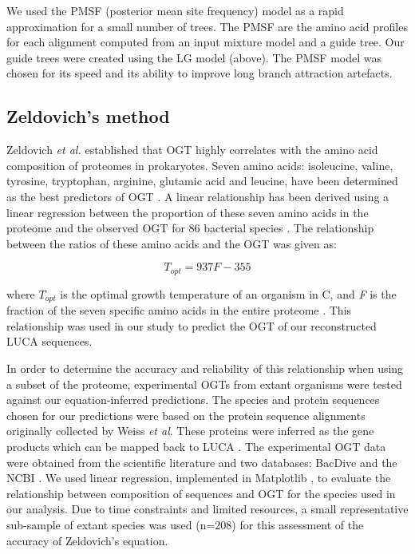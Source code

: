 We used the PMSF (posterior mean site frequency) model as a rapid approximation for a small number of trees. The PMSF are the amino acid profiles for each alignment computed from an input mixture model and a guide tree. Our guide trees were created using the LG model (above). The PMSF model was chosen for its speed and its ability to improve long branch attraction artefacts\cite{wang2017modeling}.

\subsection{Zeldovich's method}
Zeldovich \textit{et al.} \cite{zeldovich2007} established that OGT highly correlates with the amino acid composition of proteomes in prokaryotes. Seven amino acids: isoleucine, valine, tyrosine, tryptophan, arginine, glutamic acid and leucine, have been determined as the best predictors of OGT \cite{zeldovich2007}. A linear relationship has been derived using a linear regression between the proportion of these seven amino acids in the \gls{proteome} and the observed OGT for 86 bacterial species \cite{zeldovich2007}. The relationship between the ratios of these amino acids and the OGT was given as:

\[T_{opt} = 937F -355\]

\noindent where $T_{opt}$ is the optimal growth temperature of an organism in \textdegree C, and \textit{F} is the fraction of the seven specific amino acids in the entire proteome \cite{zeldovich2007}. This relationship was used in our study to predict the OGT of our reconstructed LUCA sequences.

In order to determine the accuracy and reliability of this relationship when using a subset of the proteome, experimental OGTs from extant organisms were tested against our equation-inferred predictions. The species and protein sequences chosen for our predictions were based on the protein sequence alignments originally collected by Weiss \textit{et al}. These proteins were inferred as the gene products which can be mapped back to LUCA \cite{weiss2016}. The experimental OGT data were obtained from the scientific literature and two databases: BacDive \cite{sohngen2013bacdive} and the NCBI \cite{o2015reference}. We used linear regression, implemented in Matplotlib \cite{hunter2007matplotlib}, to evaluate the relationship between composition of sequences and OGT for the species used in our analysis. Due to time constraints and limited resources, a small representative sub-sample of extant species was used (n=208) for this assessment of the accuracy of Zeldovich's equation.

